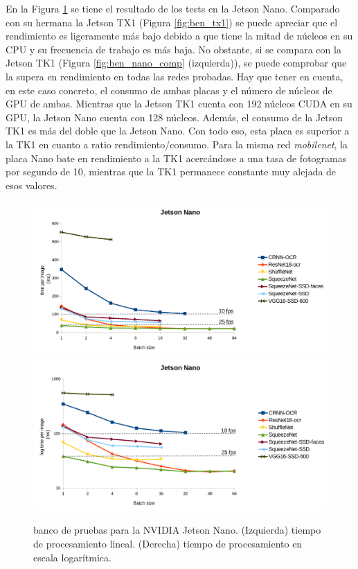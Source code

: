 En la Figura \ref{fig:ben_nano} se tiene el resultado de los tests en la Jetson Nano. Comparado con su hermana la Jetson TX1 (Figura \ref{fig:ben_tx1}) se puede apreciar que el rendimiento es ligeramente más bajo debido a que tiene la mitad de núcleos en su CPU y su frecuencia de trabajo es más baja. No obstante, si se compara con la Jetson TK1 (Figura \ref{fig:ben_nano_comp} (izquierda)), se puede comprobar que la supera en rendimiento en todas las redes probadas. Hay que tener en cuenta, en este caso concreto, el consumo de ambas placas y el número de núcleos de GPU de ambas. Mientras que la Jetson TK1 cuenta con 192 núcleos CUDA en su GPU, la Jetson Nano cuenta con 128 núcleos. Además, el consumo de la Jetson TK1 es más del doble que la Jetson Nano. Con todo eso, esta placa es superior a la TK1 en cuanto a ratio rendimiento/consumo. Para la misma red \textit{mobilenet}, la placa Nano bate en rendimiento a la TK1 acercándose a una tasa de fotogramas por segundo de 10, mientras que la TK1 permanece constante muy alejada de esos valores.

\begin{figure}[htp]
    \centering
    \captionsetup{justification=centering}
    \includegraphics[width=.5\textwidth]{img/Jetson-nano-linear.png}\hfill
    \includegraphics[width=.5\textwidth]{img/Jetson-nano-log.png}
    \caption{banco de pruebas para la NVIDIA Jetson Nano. (Izquierda) tiempo de procesamiento lineal. (Derecha) tiempo de procesamiento en escala logarítmica.}
    \label{fig:ben_nano}
\end{figure}

